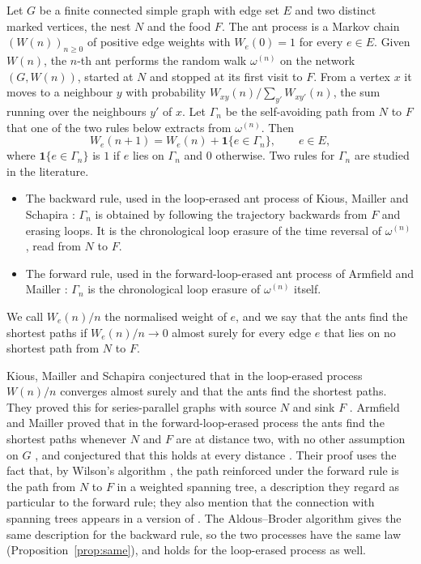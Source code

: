 \documentclass[11pt]{amsart}
\theoremstyle{remark}
\begin{document}
Let $G$ be a finite connected simple graph with edge set $E$ and two distinct marked vertices, the nest $N$ and the food $F$. The ant process is a Markov chain $(W(n))_{n\ge0}$ of positive edge weights with $W_e(0)=1$ for every $e\in E$. Given $W(n)$, the $n$-th ant performs the random walk $\omega^{(n)}$ on the network $(G,W(n))$, started at $N$ and stopped at its first visit to $F$. From a vertex $x$ it moves to a neighbour $y$ with probability $W_{xy}(n)/\sum_{y'}W_{xy'}(n)$, the sum running over the neighbours $y'$ of $x$. Let $\Gamma_n$ be the self-avoiding path from $N$ to $F$ that one of the two rules below extracts from $\omega^{(n)}$. Then
\[
W_e(n+1)=W_e(n)+\mathbf 1\{e\in\Gamma_n\},\qquad e\in E,
\]
where $\mathbf 1\{e\in\Gamma_n\}$ is $1$ if $e$ lies on $\Gamma_n$ and $0$ otherwise.
Two rules for $\Gamma_n$ are studied in the literature.
\begin{itemize}
\item The backward rule, used in the loop-erased ant process of Kious, Mailler and Schapira \cite{KMS22a}: $\Gamma_n$ is obtained by following the trajectory backwards from $F$ and erasing loops. It is the chronological loop erasure of the time reversal of $\omega^{(n)}$, read from $N$ to $F$.
\item The forward rule, used in the forward-loop-erased ant process of Armfield and Mailler \cite{AM26}: $\Gamma_n$ is the chronological loop erasure of $\omega^{(n)}$ itself.
\end{itemize}
We call $W_e(n)/n$ the normalised weight of $e$, and we say that the ants find the shortest paths if $W_e(n)/n\to0$ almost surely for every edge $e$ that lies on no shortest path from $N$ to $F$.

Kious, Mailler and Schapira conjectured \cite[Conjecture~1.1]{KMS22a} that in the loop-erased process $W(n)/n$ converges almost surely and that the ants find the shortest paths. They proved this for series-parallel graphs with source $N$ and sink $F$ \cite[Theorem~1.3]{KMS22a}. Armfield and Mailler proved that in the forward-loop-erased process the ants find the shortest paths whenever $N$ and $F$ are at distance two, with no other assumption on $G$ \cite[Theorem~1.1]{AM26}, and conjectured that this holds at every distance \cite[Section~1]{AM26}. Their proof uses the fact that, by Wilson's algorithm \cite{Wil96}, the path reinforced under the forward rule is the path from $N$ to $F$ in a weighted spanning tree, a description they regard as particular to the forward rule; they also mention that the connection with spanning trees appears in a version of \cite{MV26} \cite[footnote~1]{AM26}. The Aldous--Broder algorithm \cite{Ald90,Bro89} gives the same description for the backward rule, so the two processes have the same law (Proposition~\ref{prop:same}), and \cite[Theorem~1.1]{AM26} holds for the loop-erased process as well.
\end{document}
